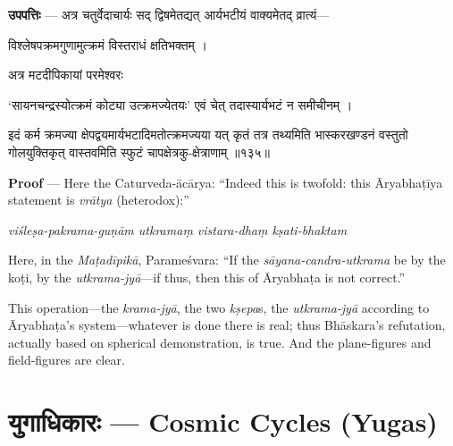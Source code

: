 \documentclass[11pt,a4paper]{article}
\newcommand{\dev}[1]{{\devanagarifont #1}}
\newcommand{\skt}[1]{{\devanagarifont\color{sktcolor} #1}}
\newenvironment{bilingual}{%
  \par\noindent
  \begin{minipage}[t]{0.47\textwidth}%
}{%
  \par\end{minipage}%
}
\newcommand{\rightcol}{%
  \par\end{minipage}%
  \hfill
  \begin{minipage}[t]{0.47\textwidth}%
}
\begin{document}
\medskip

\begin{bilingual}
\textbf{उपपत्तिः} --- अत्र चतुर्वेदाचार्यः \skt{सद् द्विषमेतद्यत् आर्यभटीयं वाक्यमेतद् व्रात्यं}---

\skt{विश्लेषपक्रमगुणामुत्क्रमं विस्तराधं क्षतिभक्तम्} ।

\skt{अत्र मटदीपिकायां परमेश्वरः}

\skt{`सायनचन्द्रस्योत्क्रमं कोट्या उत्क्रमज्येतयः' एवं चेत् तदास्यार्यभटं न समीचीनम्} ।

\skt{इदं कर्म क्रमज्या क्षेपद्वयमार्यभटादिमतोत्क्रमज्यया यत् कृतं तत्र तथ्यमिति भास्करखण्डनं वस्तुतो गोलयुक्तिकृत् वास्तवमिति स्फुटं चापक्षेत्रकु-क्षेत्राणाम्} ॥१३५॥
\rightcol
\textbf{Proof} --- Here the Caturveda-ācārya: ``Indeed this is twofold: this Āryabhaṭīya statement is \textit{vrātya} (heterodox):''

\textit{viśleṣa-pakrama-guṇām utkramaṃ vistara-dhaṃ kṣati-bhaktam}

Here, in the \textit{Maṭadīpikā}, Parameśvara: ``If the \textit{sāyana-candra-utkrama} be by the koṭi, by the \textit{utkrama-jyā}---if thus, then this of Āryabhaṭa is not correct.''

This operation---the \textit{krama-jyā}, the two \textit{kṣepa}s, the \textit{utkrama-jyā} according to Āryabhaṭa's system---whatever is done there is real; thus Bhāskara's refutation, actually based on spherical demonstration, is true. And the plane-figures and field-figures are clear.
\end{bilingual}


\newpage
\section[\dev{युगाधिकारः}]{\dev{युगाधिकारः} --- Cosmic Cycles (Yugas)}
\end{document}
